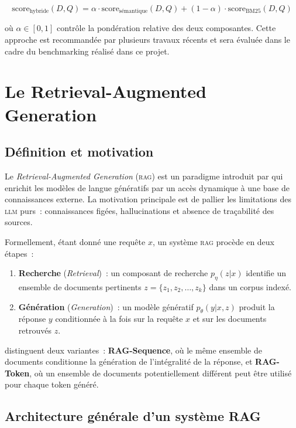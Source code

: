 \documentclass[12pt,a4paper,oneside]{report}
\newcommand{\rag}{\textsc{rag}}
\newcommand{\llm}{\textsc{llm}}
\begin{document}
\begin{equation}
\text{score}_{\text{hybride}}(D, Q) = \alpha \cdot \text{score}_{\text{sémantique}}(D, Q) + (1 - \alpha) \cdot \text{score}_{\text{BM25}}(D, Q)
\label{eq:hybrid}
\end{equation}

\noindent où $\alpha \in [0, 1]$ contrôle la pondération relative des deux composantes. Cette approche est recommandée par plusieurs travaux récents \citep{gao2024} et sera évaluée dans le cadre du benchmarking réalisé dans ce projet.

\section{Le Retrieval-Augmented Generation}
\label{sec:rag}

\subsection{Définition et motivation}

Le \textit{Retrieval-Augmented Generation} (\rag{}) est un paradigme introduit par \citet{lewis2020} qui enrichit les modèles de langue génératifs par un accès dynamique à une base de connaissances externe. La motivation principale est de pallier les limitations des \llm{} purs~: connaissances figées, hallucinations et absence de traçabilité des sources.

Formellement, étant donné une requête $x$, un système \rag{} procède en deux étapes~:
\begin{enumerate}[nosep]
  \item \textbf{Recherche} (\textit{Retrieval})~: un composant de recherche $p_\eta(z|x)$ identifie un ensemble de documents pertinents $z = \{z_1, z_2, \ldots, z_k\}$ dans un corpus indexé.
  \item \textbf{Génération} (\textit{Generation})~: un modèle génératif $p_\theta(y|x, z)$ produit la réponse $y$ conditionnée à la fois sur la requête $x$ et sur les documents retrouvés $z$.
\end{enumerate}

\citet{lewis2020} distinguent deux variantes~: \textbf{RAG-Sequence}, où le même ensemble de documents conditionne la génération de l'intégralité de la réponse, et \textbf{RAG-Token}, où un ensemble de documents potentiellement différent peut être utilisé pour chaque token généré.

\subsection{Architecture générale d'un système RAG}
\end{document}
